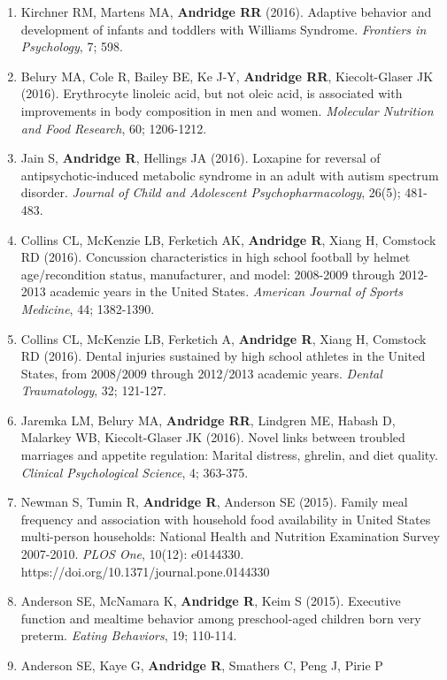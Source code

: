 \documentclass[
  english,
  letterpaper,
  DIV=11,
  numbers=noendperiod]{scrartcl}
\begin{document}
\begin{enumerate}
  revision knee and hip arthroplasty. \emph{Journal of Bone \& Joint
  Surgery}, 98; 1522-1532.
\item
  Kirchner RM, Martens MA, \textbf{Andridge RR} (2016). Adaptive
  behavior and development of infants and toddlers with Williams
  Syndrome. \emph{Frontiers in Psychology}, 7; 598.
\item
  Belury MA, Cole R, Bailey BE, Ke J-Y, \textbf{Andridge RR},
  Kiecolt-Glaser JK (2016). Erythrocyte linoleic acid, but not oleic
  acid, is associated with improvements in body composition in men and
  women. \emph{Molecular Nutrition and Food Research}, 60; 1206-1212.
\item
  Jain S, \textbf{Andridge R}, Hellings JA (2016). Loxapine for reversal
  of antipsychotic-induced metabolic syndrome in an adult with autism
  spectrum disorder. \emph{Journal of Child and Adolescent
  Psychopharmacology}, 26(5); 481-483.
\item
  Collins CL, McKenzie LB, Ferketich AK, \textbf{Andridge R}, Xiang H,
  Comstock RD (2016). Concussion characteristics in high school football
  by helmet age/recondition status, manufacturer, and model: 2008-2009
  through 2012-2013 academic years in the United States. \emph{American
  Journal of Sports Medicine}, 44; 1382-1390.
\item
  Collins CL, McKenzie LB, Ferketich A, \textbf{Andridge R}, Xiang H,
  Comstock RD (2016). Dental injuries sustained by high school athletes
  in the United States, from 2008/2009 through 2012/2013 academic years.
  \emph{Dental Traumatology}, 32; 121-127.
\item
  Jaremka LM, Belury MA, \textbf{Andridge RR}, Lindgren ME, Habash D,
  Malarkey WB, Kiecolt-Glaser JK (2016). Novel links between troubled
  marriages and appetite regulation: Marital distress, ghrelin, and diet
  quality. \emph{Clinical Psychological Science}, 4; 363-375.
\item
  Newman S, Tumin R, \textbf{Andridge R}, Anderson SE (2015). Family
  meal frequency and association with household food availability in
  United States multi-person households: National Health and Nutrition
  Examination Survey 2007-2010. \emph{PLOS One}, 10(12): e0144330.
  https://doi.org/10.1371/journal.pone.0144330
\item
  Anderson SE, McNamara K, \textbf{Andridge R}, Keim S (2015). Executive
  function and mealtime behavior among preschool-aged children born very
  preterm. \emph{Eating Behaviors}, 19; 110-114.
\item
  Anderson SE, Kaye G, \textbf{Andridge R}, Smathers C, Peng J, Pirie P

\end{enumerate}
\end{document}
